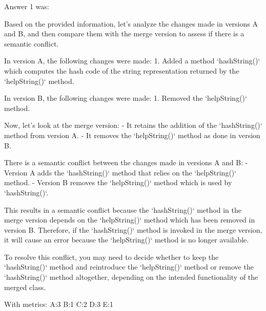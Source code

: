 Answer 1 was:
\begin{spverbatim}
Based on the provided information, let's analyze the changes made in versions A and B, and then compare them with the merge version to assess if there is a semantic conflict.

In version A, the following changes were made:
1. Added a method `hashString()` which computes the hash code of the string representation returned by the `helpString()` method.

In version B, the following changes were made:
1. Removed the `helpString()` method.

Now, let's look at the merge version:
- It retains the addition of the `hashString()` method from version A.
- It removes the `helpString()` method as done in version B.

There is a semantic conflict between the changes made in versions A and B:
- Version A adds the `hashString()` method that relies on the `helpString()` method.
- Version B removes the `helpString()` method which is used by `hashString()`.

This results in a semantic conflict because the `hashString()` method in the merge version depends on the `helpString()` method which has been removed in version B. Therefore, if the `hashString()` method is invoked in the merge version, it will cause an error because the `helpString()` method is no longer available.

To resolve this conflict, you may need to decide whether to keep the `hashString()` method and reintroduce the `helpString()` method or remove the `hashString()` method altogether, depending on the intended functionality of the merged class.
\end{spverbatim}

With metrics:
A:3
B:1
C:2
D:3
E:1

